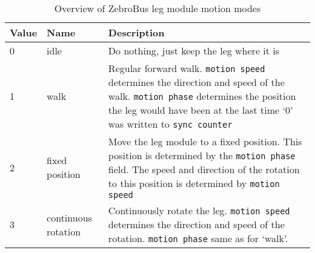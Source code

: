 \begin{table}[H]
    \begin{center}
    \caption{Overview of ZebroBus leg module motion modes}
    \label{tab:leg_motion_modes}
    \begin{tabularx}{\textwidth}{llX}
    \toprule
    Value & Name & Description\\ \midrule
    0 & idle & Do nothing, just keep the leg where it is\\
    1 & walk & Regular forward walk.
                \verb|motion speed| determines the direction and speed of the walk.
                \verb|motion phase| determines the position the leg would have been
                            at the last time `0' was written to \verb|sync counter|\\
    2 & fixed position & Move the leg module to a fixed position.
                This position is determined by the \verb|motion phase| field.
                The speed and direction of the rotation to this position is determined by \verb|motion speed|\\
    3 & continuous rotation & Continuously rotate the leg.
                \verb|motion speed| determines the direction and speed of the rotation.
                \verb|motion phase| same as for `walk'. \\
    \bottomrule
    \end{tabularx}
    \end{center}
\end{table}
